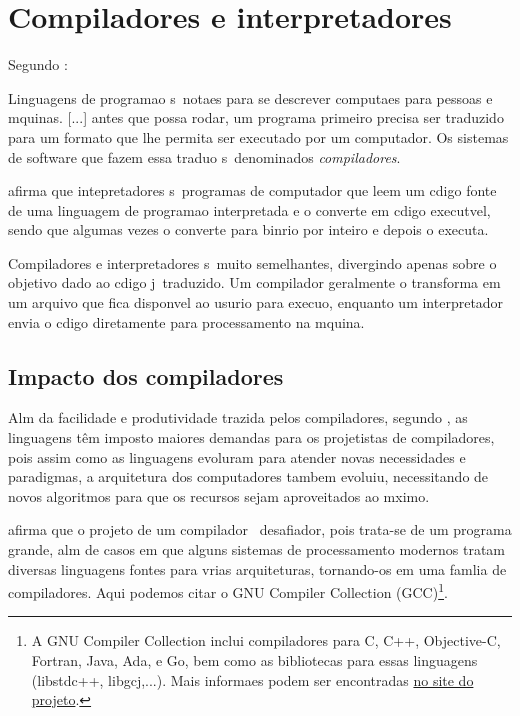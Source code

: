 
\section{Compiladores e interpretadores}
\label{revisao:compiladores-interpretadores}

Segundo \cite{Aho08}:

\begin{citacao}
Linguagens de programa\ca o s\ao\ nota\co es para se descrever computa\co es para pessoas e m\ah quinas. [...] antes que possa rodar, um programa primeiro precisa ser traduzido para um formato que lhe permita ser executado por um computador.
Os sistemas de software que fazem essa tradu\ca o s\ao\ denominados \emph{compiladores}.
\end{citacao}

\cite{wiki:interpretadores} afirma que intepretadores s\ao\ programas de computador que leem um c\oh digo fonte de uma linguagem de programa\ca o interpretada e o converte em c\oh digo execut\ah vel, sendo que algumas vezes o converte para bin\ah rio por inteiro e depois o executa.

Compiladores e interpretadores s\ao\ muito semelhantes, divergindo apenas sobre o objetivo dado ao c\oh digo j\ah\ traduzido. Um compilador geralmente o transforma em um arquivo que fica dispon\ih vel ao usu\ah rio para execu\ca o, enquanto um interpretador envia o c\oh digo diretamente para processamento na m\ah quina.


\subsection{Impacto dos compiladores}

Al\eh m da facilidade e produtividade trazida pelos compiladores, segundo \cite{Aho08}, as linguagens t\^em imposto maiores demandas para os projetistas de compiladores, pois assim como as linguagens evolu\ih ram para atender novas necessidades e paradigmas, a arquitetura dos computadores tambem evoluiu, necessitando de novos algoritmos para que os recursos sejam aproveitados ao m\ah ximo.

\cite{Aho08} afirma que o projeto de um compilador \eh\ desafiador, pois trata-se de um programa grande, al\eh m de casos em que alguns sistemas de processamento modernos tratam diversas linguagens fontes para v\ah rias arquiteturas, tornando-os em uma fam\ih lia de compiladores. Aqui podemos citar o GNU Compiler Collection (GCC)\footnote{A GNU Compiler Collection inclui compiladores para C, C++, Objective-C, Fortran, Java, Ada, e Go, bem como as bibliotecas para essas linguagens (libstdc++, libgcj,...). Mais informa\co es podem ser encontradas \href{http://gcc.gnu.org}{no site do projeto}.}.
